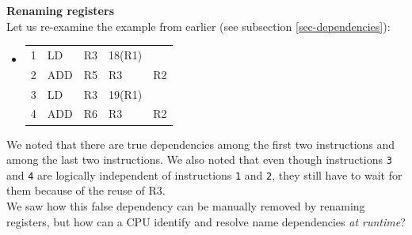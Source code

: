 \documentclass[12pt,a4paper]{article} %
\newenvironment {assembly}{\begingroup \ttfamily \color{Gray} \begin{itemize} \item[]}{\end{itemize}\endgroup}
\begin{document}
\textbf{Renaming registers}\\
Let us re-examine the example from earlier (see subsection \ref{sec-dependencies}):
\begin{assembly}
	\begin{tabularx} {\textwidth} {n o a a X}
		1 & LD  & R3 & 18(R1)	& \\
		2 & ADD & R5 & R3		& R2\\
		3 & LD  & R3 & 19(R1)	& \\
		4 & ADD & R6 & R3		& R2\\
	\end{tabularx}
\end{assembly}
We noted that there are true dependencies among the first two instructions and among the last two instructions. We also noted that even though instructions \texttt{3} and \texttt{4} are logically independent of instructions \texttt{1} and \texttt{2}, they still have to wait for them because of the reuse of R3.\\
We saw how this false dependency can be manually removed by renaming registers, but how can a CPU identify and resolve name dependencies \textit{at runtime}?\\
\end{document}
